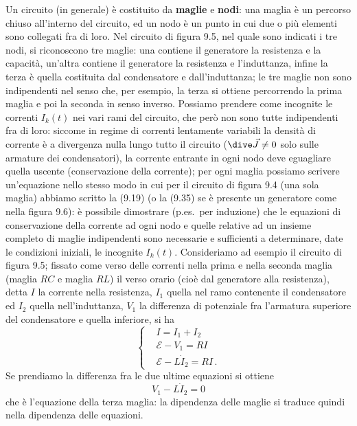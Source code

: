 Un circuito (in generale) \`e costituito da \textbf{maglie} e \textbf{nodi}: una
maglia \`e un percorso chiuso all'interno del circuito, ed un nodo \`e un punto
in cui due o pi\`u elementi sono collegati fra di loro. Nel circuito di figura
9.5, nel quale sono indicati i tre nodi, si riconoscono tre maglie: una contiene
il generatore la resistenza e la capacit\`a, un'altra contiene il generatore la
resistenza e l'induttanza, infine la terza \`e quella costituita dal
condensatore e dall'induttanza; le tre maglie non sono indipendenti nel senso
che, per esempio, la terza si ottiene percorrendo la prima maglia e poi la
seconda in senso inverso.
Possiamo prendere come incognite le correnti $I_k(t)$ nei vari rami del
circuito, che per\`o non sono tutte indipendenti fra di loro: siccome in regime
di correnti lentamente variabili la densit\`a di corrente \`e a divergenza nulla
lungo tutto il circuito ($\dive\vec J\ne0$ solo sulle armature dei
condensatori), la corrente entrante in ogni nodo deve eguagliare quella uscente
(conservazione della corrente); per ogni maglia possiamo scrivere un'equazione
nello stesso modo in cui per il circuito di figura 9.4 (una sola maglia) abbiamo
scritto la (9.19) (o la (9.35) se \`e presente un generatore come nella figura
9.6): \`e possibile dimostrare (p.es.\ per induzione) che le equazioni di
conservazione della corrente ad ogni nodo e quelle relative ad un insieme
completo di maglie indipendenti sono necessarie e sufficienti a determinare,
date le condizioni iniziali, le incognite $I_k(t)$.
Consideriamo ad esempio il circuito di figura 9.5; fissato come verso delle
correnti nella prima e nella seconda maglia (maglia $RC$ e maglia $RL$) il verso
orario (cio\`e dal generatore alla resistenza), detta $I$ la corrente nella
resistenza, $I_1$ quella nel ramo contenente il condensatore ed $I_2$ quella
nell'induttanza, $V_1$ la differenza di potenziale fra l'armatura superiore del
condensatore e quella inferiore, si ha
\begin{equation}
  \left\{\begin{aligned}
    &I=I_1+I_2\\
    &\mathcal E-V_1=RI\\
    &\mathcal E-L\dot I_2=RI\,.
  \end{aligned}\right.
  \tag{9.36}
\end{equation}
Se prendiamo la differenza fra le due ultime equazioni si ottiene
\begin{equation}
  V_1-L\dot I_2=0
  \tag{9.37}
\end{equation}
che \`e l'equazione della terza maglia: la dipendenza delle maglie si traduce
quindi nella dipendenza delle equazioni.

